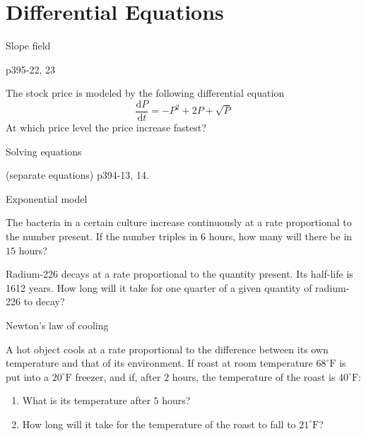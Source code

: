 \section[DiffEqn]{Differential Equations}
\begin{frame}{Slope field}

\begin{example}
p395-22, 23
\end{example}



\begin{example}
The stock price is modeled by the following differential equation
\[
\frac{\mathrm{d}P}{\mathrm{d}t}=-P^{2}+2P+\sqrt{P}
\]
At which price level the price increase fastest?
\end{example}

\end{frame}

\begin{frame}{Solving equations}

\begin{example}
(separate equations) p394-13, 14.
\end{example}

\end{frame}

\begin{frame}{Exponential model}

\begin{example}
The bacteria in a certain culture increase continuously at a rate
proportional to the number present. If the number triples in $6$
hours, how many will there be in $15$ hours?
\end{example}



\begin{example}
Radium-226 decays at a rate proportional to the quantity present.
Its half-life is 1612 years. How long will it take for one quarter
of a given quantity of radium-226 to decay?
\end{example}

\end{frame}

\begin{frame}{Newton's law of cooling}

\begin{example}
A hot object cools at a rate proportional to the difference between
its own temperature and that of its environment. If roast at room
temperature $68^{\circ}\mathrm{F}$ is put into a $20^{\circ}\mathrm{F}$
freezer, and if, after $2$ hours, the temperature of the roast is
$40^{\circ}\mathrm{F}$:
\begin{enumerate}
\item What is its temperature after $5$ hours?
\item How long will it take for the temperature of the roast to fall to
$21^{\circ}\mathrm{F}$?
\end{enumerate}

\end{example}

\end{frame}

